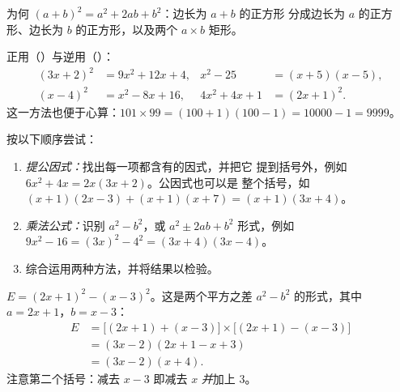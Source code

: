 \begin{omfigure}

{\small 为何 $(a+b)^2 = a^2 + 2ab + b^2$：边长为 $a + b$ 的正方形
分成边长为 $a$ 的正方形、边长为 $b$ 的正方形，以及两个 $a \times b$
矩形。}
\end{omfigure}

\begin{example}\label{ex:g10:algebra:identities}
正用（）与逆用（）：
\begin{align*}
(3x + 2)^2 &= 9x^2 + 12x + 4,
& x^2 - 25 &= (x+5)(x-5), \\
(x - 4)^2 &= x^2 - 8x + 16,
& 4x^2 + 4x + 1 &= (2x + 1)^2 .
\end{align*}
这一方法也便于心算：$101 \times 99 = (100+1)(100-1) =
10000 - 1 = 9999$。
\end{example}

\begin{method}[式子的因式分解]\label{met:g10:algebra:factor}
按以下顺序尝试：
\begin{enumerate}
  \item \emph{提公因式：}找出每一项都含有的因式，并把它
        提到括号外，例如 $6x^2 + 4x = 2x(3x + 2)$。公因式也可以是
        整个括号，如 $(x+1)(2x-3) + (x+1)(x+7) = (x+1)(3x+4)$。
  \item \emph{乘法公式：}识别 $a^2 - b^2$，或
        $a^2 \pm 2ab + b^2$ 形式，例如 $9x^2 - 16 = (3x)^2 - 4^2 =
        (3x+4)(3x-4)$。
  \item 综合运用两种方法，并将结果以检验。
\end{enumerate}
\end{method}

\begin{example}\label{ex:g10:algebra:factorsteps}
 $E = (2x + 1)^2 - (x - 3)^2$。这是两个平方之差
$a^2 - b^2$ 的形式，其中 $a = 2x+1$，$b = x-3$：
\begin{align*}
E &= \bigl[(2x+1) + (x-3)\bigr] \times \bigl[(2x+1) - (x-3)\bigr] \\
  &= (3x - 2)(2x + 1 - x + 3) \\
  &= (3x - 2)(x + 4).
\end{align*}
注意第二个括号：减去 $x - 3$ 即减去 $x$
\emph{并}加上 $3$。
\end{example}

